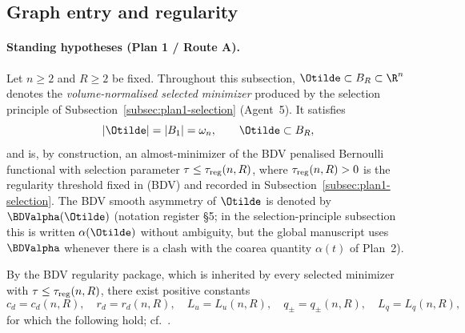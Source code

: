 \subsection{Graph entry and regularity}
\label{subsec:plan1-graph-entry}

\paragraph{Standing hypotheses (Plan 1 / Route A).}
Let \(n\ge 2\) and \(R\ge 2\) be fixed. Throughout this subsection,
\(\Otilde\subset B_R\subset\R^n\) denotes the \emph{volume-normalised
selected minimizer} produced by the selection principle of
Subsection~\ref{subsec:plan1-selection} (Agent~5). It satisfies
\begin{equation}\label{eq:plan1-ge-Otilde}
   |\Otilde|=|B_1|=\omega_n,\qquad \Otilde\subset B_R,
\end{equation}
and is, by construction, an almost-minimizer of the BDV penalised Bernoulli
functional with selection parameter \(\tau\le\tau_{\rm reg}(n,R)\), where
\(\tau_{\rm reg}(n,R)>0\) is the regularity threshold fixed in
\cite[\S 4]{BDV} (BDV) and recorded in Subsection~\ref{subsec:plan1-selection}.
The BDV smooth asymmetry of \(\Otilde\) is denoted by \(\BDValpha(\Otilde)\)
(notation register \S 5; in the selection-principle subsection this is
written \(\alpha(\Otilde)\) without ambiguity, but the global manuscript
uses \(\BDValpha\) whenever there is a clash with the coarea quantity
\(\alpha(t)\) of Plan~2).

By the BDV regularity package, which is inherited by every selected
minimizer with \(\tau\le\tau_{\rm reg}(n,R)\), there exist positive
constants
\[
   c_d=c_d(n,R),\quad r_d=r_d(n,R),\quad
   L_u=L_u(n,R),\quad
   q_\pm=q_\pm(n,R),\quad L_q=L_q(n,R),
\]
for which the following hold; cf.\
\cite[Lemmas 4.9, 4.12, 4.16, Theorem 4.18]{BDV}.

